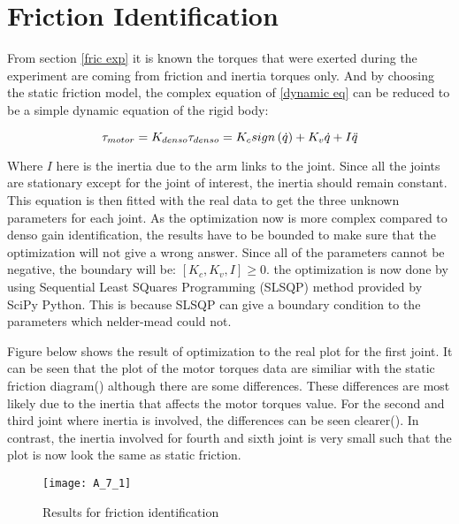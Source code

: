 \section{Friction Identification}

From section \ref{fric exp} it is known the torques that were exerted during the experiment are coming from friction and inertia torques only. And by choosing the static friction model, the complex equation of \ref{dynamic eq} can be reduced to be a simple dynamic equation of the rigid body:

\begin{equation}
  \tau_{motor} = K_{denso} \tau_{denso} = K_{c} sign\left(\dot{q}\right) + K_{v} \dot{q} + I\ddot{q} \\
\end{equation}

Where $ I $ here is the inertia due to the arm links to the joint. Since all the joints are stationary except for the joint of interest, the inertia should remain constant. This equation is then fitted with the real data to get the three unknown parameters for each joint. As the optimization now is more complex compared to denso gain identification, the results have to be bounded to make sure that the optimization will not give a wrong answer. Since all of the parameters cannot be negative, the boundary will be: $[K_{c}, K_{v}, I] \geq 0$. the optimization is now done by using Sequential Least SQuares Programming (SLSQP) method provided by SciPy Python. This is because SLSQP can give a boundary condition to the parameters which nelder-mead could not.


Figure below shows the result of optimization to the real plot for the first joint. It can be seen that the plot of the motor torques data are similiar with the static friction diagram() although there are some differences. These differences are most likely due to the inertia that affects the motor torques value. For the second and third joint where inertia is involved, the differences can be seen clearer(). In contrast, the inertia involved for fourth and sixth joint is very small such that the plot is now look the same as static friction.
 
\begin{figure}[H]
    \centering
    \texttt{[image: A\_7\_1]}
    \caption{Results for friction identification}
    \label{fig: fric iden}
\end{figure}

